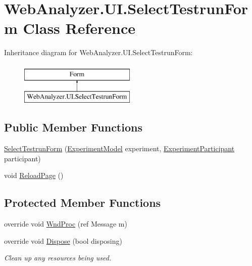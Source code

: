 \hypertarget{class_web_analyzer_1_1_u_i_1_1_select_testrun_form}{}\section{Web\+Analyzer.\+U\+I.\+Select\+Testrun\+Form Class Reference}
\label{class_web_analyzer_1_1_u_i_1_1_select_testrun_form}
Inheritance diagram for Web\+Analyzer.\+U\+I.\+Select\+Testrun\+Form\+:\begin{figure}[H]
\begin{center}
\leavevmode
\includegraphics[height=2.000000cm]{class_web_analyzer_1_1_u_i_1_1_select_testrun_form}
\end{center}
\end{figure}
\subsection*{Public Member Functions}
\begin{DoxyCompactItemize}
\item 
\hyperlink{class_web_analyzer_1_1_u_i_1_1_select_testrun_form_ad8de83de444fe5832e7bb01fbd488825}{Select\+Testrun\+Form} (\hyperlink{class_web_analyzer_1_1_models_1_1_base_1_1_experiment_model}{Experiment\+Model} experiment, \hyperlink{class_web_analyzer_1_1_models_1_1_base_1_1_experiment_participant}{Experiment\+Participant} participant)
\item 
void \hyperlink{class_web_analyzer_1_1_u_i_1_1_select_testrun_form_ae48e9a01abdea5b4ff4f4c8d219d8e2e}{Reload\+Page} ()
\end{DoxyCompactItemize}
\subsection*{Protected Member Functions}
\begin{DoxyCompactItemize}
\item 
override void \hyperlink{class_web_analyzer_1_1_u_i_1_1_select_testrun_form_a33ab94419d2cedd042a3a6894c060e8f}{Wnd\+Proc} (ref Message m)
\item 
override void \hyperlink{class_web_analyzer_1_1_u_i_1_1_select_testrun_form_a5cef96e7db81ffcde7521e814bbcec79}{Dispose} (bool disposing)
\begin{DoxyCompactList}\small\item\em Clean up any resources being used. \end{DoxyCompactList}\end{DoxyCompactItemize}
